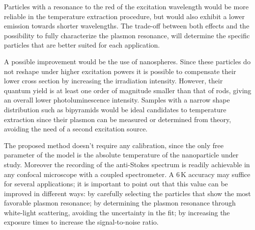 \documentclass[journal=nalefd,manuscript=letter]{achemso}
\newcommand{\K}{\ensuremath{\,\textrm{K}}}
\begin{document}
Particles with a resonance to the red of the excitation wavelength would be more
reliable in the temperature extraction procedure, but would also exhibit a lower
emission towards shorter wavelengths. The trade-off between both effects and
the possibility to fully characterize the plasmon resonance, will determine the
specific particles that are better suited for each application.

A possible improvement would be the use of nanospheres. Since these particles do
not reshape under higher excitation powers it is possible to compensate their
lower cross section by increasing the irradiation intensity. However, their
quantum yield is at least one order of magnitude smaller than that of rods,
giving an overall lower photoluminescence intensity. Samples with a narrow shape
distribution such as bipyramids\cite{Pelton2009}  would be ideal candidates to
temperature extraction since their plasmon can be measured or determined from
theory, avoiding the need of a second excitation source.


The proposed method doesn't require any calibration, since the only free
parameter of the model is the absolute temperature of the nanoparticle under
study. Moreover the recording of the anti-Stokes spectrum is readily achievable
in any confocal microscope with a coupled spectrometer. A $6\K$ accuracy may
suffice for several applications; it is important to point out that this value
can be improved in different ways: by carefully selecting the particles that
show the most favorable plasmon resonance; by determining the plasmon resonance
through white-light scattering, avoiding the uncertainty in the fit; by
increasing the exposure times to increase the signal-to-noise ratio.


\end{document}
